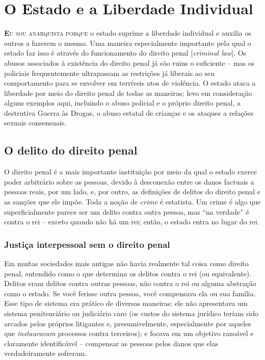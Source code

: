 
\chapter{O Estado e a Liberdade Individual}
\label{chap:5}

\lettrine[lines=2]{\textcolor{LettrineColor}{\textbf{E}}}{u sou anarquista porque} o estado suprime a liberdade individual e auxilia os outros a fazerem o mesmo. Uma maneira especialmente importante pela qual o estado faz isso é através do funcionamento do direito penal [\emph{criminal law}]. Os abusos associados à existência do direito penal já são ruins o suficiente -- mas os policiais frequentemente ultrapassam as restrições já liberais ao seu comportamento para se envolver em terríveis atos de violência. O estado ataca a liberdade por meio do direito penal de todas as maneiras; levo em consideração alguns exemplos aqui, incluindo o abuso policial e o próprio direito penal, a destrutiva Guerra às Drogas, o abuso estatal de crianças e os ataques a relações sexuais consensuais.

\section{O delito do direito penal}

O direito penal é a mais importante instituição por meio da qual o estado exerce poder arbitrário sobre as pessoas, devido à desconexão entre os danos factuais a pessoas reais, por um lado, e, por outro, as definições de delitos do direito penal e as sanções que ele impõe. Toda a noção de \emph{crime} é estatista. Um crime é algo que superficialmente parece ser um delito contra outra pessoa, mas ``na verdade'' é contra o rei -- exceto quando não há um rei; então, o estado entra no lugar do rei.

\subsection*{Justiça interpessoal sem o direito penal}

Em muitas sociedades mais antigas não havia realmente tal coisa como direito penal, entendido como o que determina os delitos contra o rei (ou equivalente). Delitos eram delitos contra outras pessoas, não contra o rei ou alguma abstração como o estado. Se você ferisse outra pessoa, você compensava ela ou sua família. Esse tipo de sistema era prático de diversas maneiras: ele não apresentava um sistema penitenciário ou judiciário caro (os custos do sistema jurídico teriam sido arcados pelos próprios litigantes e, presumivelmente, especialmente por aqueles que \emph{instauravam} processos contra terceiros); e focava em um objetivo razoável e claramente identificável -- compensar as pessoas pelos danos que elas verdadeiramente sofreram.


